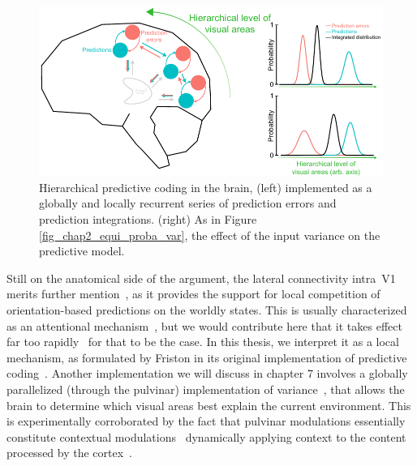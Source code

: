 \begin{figure}[h!tbp]
\vspace{0.5cm}
\centering
\includegraphics[width=1.\textwidth]{fig/chap2_fig_hierarchical_pc.pdf}
\caption[Hierarchical predictive coding in the brain]{Hierarchical predictive coding in the brain, (left) implemented as a globally and locally recurrent series of prediction errors and prediction integrations. (right) As in Figure \ref{fig_chap2_equi_proba_var}, the effect of the input variance on the predictive model.}
\label{fig_chap2_brainlevel_pc}
\end{figure}

Still on the anatomical side of the argument, the lateral connectivity intra~\gls{V1} merits further mention~\cite{thomson2003interlaminar,chavane2011lateral,katzel2011columnar}, as it provides the support for local competition of orientation-based predictions on the worldly states. This is usually characterized as an attentional mechanism~\cite{friston2012predictive,ainley2016bodily}, but we would contribute here that it takes effect far too rapidly~\cite{ladret2023cortical} for that to be the case. In this thesis, we interpret it as a local mechanism, as formulated by Friston in its original implementation of predictive coding~\cite{friston2005theory}.
Another implementation we will discuss in chapter 7 involves a globally parallelized (through the pulvinar) implementation of variance~\cite{kanai2015cerebral}, that allows the brain to determine which visual areas best explain the current environment. This is experimentally corroborated by the fact that pulvinar modulations essentially constitute contextual modulations~\cite{robinson1992pulvinar, casanova2001higher,de2020pulvinar} dynamically applying context to the content processed by the cortex~\cite{purushothaman2012gating}.

